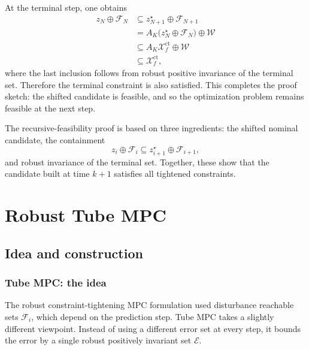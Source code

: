 At the terminal step, one obtains
\[
\begin{aligned}
    z_N\oplus \mathcal F_N
    &\subseteq
    z_{N+1}^\star\oplus \mathcal F_{N+1} \\
    &=
    A_K\bigl(z_N^\star\oplus \mathcal F_N\bigr)\oplus \mathcal W \\
    &\subseteq
    A_K\mathcal X_f^{\mathrm{ct}}\oplus \mathcal W \\
    &\subseteq
    \mathcal X_f^{\mathrm{ct}},
\end{aligned}
\]
where the last inclusion follows from robust positive invariance of the terminal set. Therefore
the terminal constraint is also satisfied. This completes the proof sketch: the shifted candidate is
feasible, and so the optimization problem remains feasible at the next step.

\begin{theorembox}
The recursive-feasibility proof is based on three ingredients:
the shifted nominal candidate, the containment
\[
    z_i\oplus\mathcal F_i\subseteq z_{i+1}^\star\oplus\mathcal F_{i+1},
\]
and robust invariance of the terminal set. Together, these show that the candidate built at time
\(k+1\) satisfies all tightened constraints.
\end{theorembox}
\section{Robust Tube MPC}

\subsection{Idea and construction}

\subsubsection{Tube MPC: the idea}

The robust constraint-tightening MPC formulation used disturbance reachable sets
\(\mathcal F_i\), which depend on the prediction step. Tube MPC takes a slightly different
viewpoint. Instead of using a different error set at every step, it bounds the error by a single
robust positively invariant set \(\mathcal E\).\\

